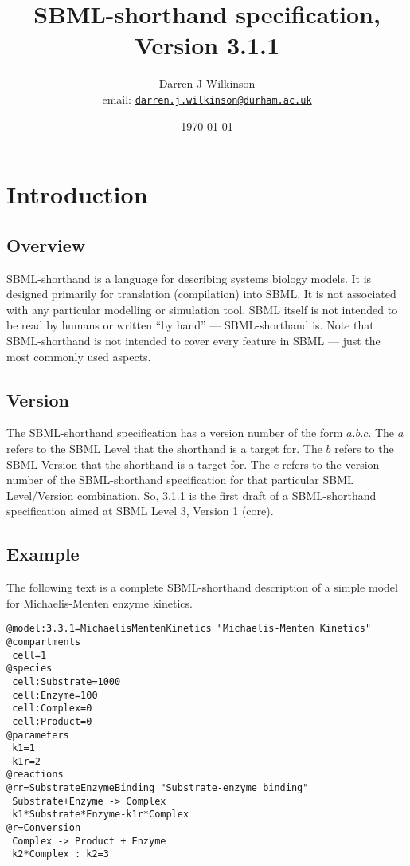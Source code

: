 \documentclass[11pt,a4paper]{article}
\title{SBML-shorthand specification, Version 3.1.1}
\author{\href{https://darrenjw.github.io/}{Darren J
Wilkinson}\\
email: \href{mailto:darren.j.wilkinson@durham.ac.uk}{\texttt{darren.j.wilkinson@durham.ac.uk}}}
\date{\today}
\begin{document}
\sf
\maketitle

\tableofcontents

\newpage

\section{Introduction}

\subsection{Overview}

SBML-shorthand is a language for describing systems biology models. It
is designed primarily for translation (compilation) into SBML. It is
not associated with any particular modelling or simulation tool. SBML
itself is not intended to be read by humans or written ``by hand'' ---
SBML-shorthand is. Note that SBML-shorthand is not intended to cover
every feature in SBML --- just the most commonly used aspects.

\subsection{Version}

The SBML-shorthand specification has a version number of the form
$a.b.c$. The $a$ refers to the SBML Level that the shorthand is a
target for. The $b$ refers to the SBML Version that the shorthand is a
target for. The $c$ refers to the version number of the SBML-shorthand
specification for that particular SBML Level/Version combination. So,
3.1.1 is the first draft of a SBML-shorthand specification aimed at
SBML Level 3, Version 1 (core).

\subsection{Example}

The following text is a complete SBML-shorthand description of a
simple model for Michaelis-Menten enzyme kinetics.

{\small
\begin{verbatim}
@model:3.3.1=MichaelisMentenKinetics "Michaelis-Menten Kinetics"
@compartments
 cell=1
@species
 cell:Substrate=1000
 cell:Enzyme=100
 cell:Complex=0
 cell:Product=0
@parameters
 k1=1
 k1r=2
@reactions
@rr=SubstrateEnzymeBinding "Substrate-enzyme binding"
 Substrate+Enzyme -> Complex
 k1*Substrate*Enzyme-k1r*Complex
@r=Conversion
 Complex -> Product + Enzyme
 k2*Complex : k2=3
\end{verbatim}}
\end{document}
